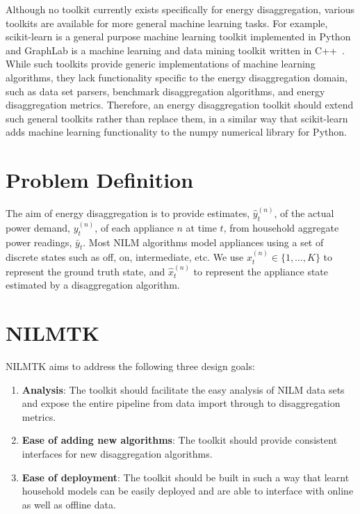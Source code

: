\documentclass{sig-alternate}
\begin{document}
Although no toolkit currently exists specifically for energy disaggregation, various toolkits are available for more general machine learning tasks. For example, scikit-learn is a general purpose machine learning toolkit implemented in Python~\cite{scikit-learn} and GraphLab is a machine learning and data mining toolkit written in C++~\cite{graphlab}. While such toolkits provide generic implementations of machine learning algorithms, they lack functionality specific to the energy disaggregation domain, such as data set parsers, benchmark disaggregation algorithms, and energy disaggregation metrics. Therefore, an energy disaggregation toolkit should extend such general toolkits rather than replace them, in a similar way that scikit-learn adds machine learning functionality to the numpy numerical library for Python. 

\section{Problem Definition}
\label{sec:problem}

\noindent 
The aim of energy disaggregation is to provide estimates, $\hat{y}^{(n)}_t$, of the actual power demand, $y^{(n)}_t$, of each appliance $n$ at time $t$, from household aggregate power readings, $\bar{y}_t$. Most NILM algorithms model appliances using a set of discrete states such as off, on, intermediate, etc.  We use $x^{(n)}_t \in \{1, \dots, K\}$ to represent the ground truth state, and $\hat{x}^{(n)}_t$ to represent the appliance state estimated by a disaggregation algorithm.

\section{NILMTK}
\label{sec:nilmtk}

\noindent
NILMTK aims to address the following three design goals:
\begin{enumerate}
\item \textbf{Analysis}: The toolkit should facilitate the easy analysis of NILM data sets and expose the entire pipeline from data import through to disaggregation metrics. 
\item \textbf{Ease of adding new algorithms}: The toolkit should provide consistent interfaces for new disaggregation algorithms.
\item \textbf{Ease of deployment}: The toolkit should be built in such a way that learnt household models can be easily deployed and are able to interface with online as well as offline data.
\end{enumerate}
\end{document}
